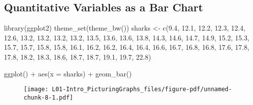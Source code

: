 \documentclass[
  letterpaper,
  DIV=11,
  numbers=noendperiod]{scrreprt}
\newenvironment{Shaded}{\begin{snugshade}}{\end{snugshade}}
\newcommand{\AttributeTok}[1]{\textcolor[rgb]{0.40,0.45,0.13}{#1}}
\newcommand{\FloatTok}[1]{\textcolor[rgb]{0.68,0.00,0.00}{#1}}
\newcommand{\FunctionTok}[1]{\textcolor[rgb]{0.28,0.35,0.67}{#1}}
\newcommand{\NormalTok}[1]{\textcolor[rgb]{0.00,0.23,0.31}{#1}}
\newcommand{\OtherTok}[1]{\textcolor[rgb]{0.00,0.23,0.31}{#1}}
\newcommand{\SpecialCharTok}[1]{\textcolor[rgb]{0.37,0.37,0.37}{#1}}
\begin{document}
\hypertarget{quantitative-variables-as-a-bar-chart}{%
\subsection{Quantitative Variables as a Bar
Chart}\label{quantitative-variables-as-a-bar-chart}}

\begin{Shaded}
\begin{Highlighting}[]
\FunctionTok{library}\NormalTok{(ggplot2)}
\FunctionTok{theme\_set}\NormalTok{(}\FunctionTok{theme\_bw}\NormalTok{())}
\NormalTok{sharks }\OtherTok{\textless{}{-}}  \FunctionTok{c}\NormalTok{(}\FloatTok{9.4}\NormalTok{, }\FloatTok{12.1}\NormalTok{, }\FloatTok{12.2}\NormalTok{, }\FloatTok{12.3}\NormalTok{, }\FloatTok{12.4}\NormalTok{, }\FloatTok{12.6}\NormalTok{, }\FloatTok{13.2}\NormalTok{, }\FloatTok{13.2}\NormalTok{, }\FloatTok{13.2}\NormalTok{, }\FloatTok{13.2}\NormalTok{, }\FloatTok{13.5}\NormalTok{,}
\FloatTok{13.6}\NormalTok{, }\FloatTok{13.6}\NormalTok{, }\FloatTok{13.8}\NormalTok{, }\FloatTok{14.3}\NormalTok{, }\FloatTok{14.6}\NormalTok{, }\FloatTok{14.7}\NormalTok{, }\FloatTok{14.9}\NormalTok{, }\FloatTok{15.2}\NormalTok{, }\FloatTok{15.3}\NormalTok{, }\FloatTok{15.7}\NormalTok{, }\FloatTok{15.7}\NormalTok{,}
\FloatTok{15.8}\NormalTok{, }\FloatTok{15.8}\NormalTok{, }\FloatTok{16.1}\NormalTok{, }\FloatTok{16.2}\NormalTok{, }\FloatTok{16.2}\NormalTok{, }\FloatTok{16.4}\NormalTok{, }\FloatTok{16.4}\NormalTok{, }\FloatTok{16.6}\NormalTok{, }\FloatTok{16.7}\NormalTok{, }\FloatTok{16.8}\NormalTok{, }\FloatTok{16.8}\NormalTok{,}
\FloatTok{17.6}\NormalTok{, }\FloatTok{17.8}\NormalTok{, }\FloatTok{17.8}\NormalTok{, }\FloatTok{18.2}\NormalTok{, }\FloatTok{18.3}\NormalTok{, }\FloatTok{18.6}\NormalTok{, }\FloatTok{18.7}\NormalTok{, }\FloatTok{18.7}\NormalTok{, }\FloatTok{19.1}\NormalTok{, }\FloatTok{19.7}\NormalTok{, }\FloatTok{22.8}\NormalTok{)}

\FunctionTok{ggplot}\NormalTok{() }\SpecialCharTok{+} \FunctionTok{aes}\NormalTok{(}\AttributeTok{x =}\NormalTok{ sharks) }\SpecialCharTok{+} \FunctionTok{geom\_bar}\NormalTok{()}
\end{Highlighting}
\end{Shaded}

\begin{figure}[H]

{\centering \texttt{[image: L01-Intro\_PicturingGraphs\_files/figure-pdf/unnamed-chunk-8-1.pdf]}

}

\end{figure}
\end{document}
